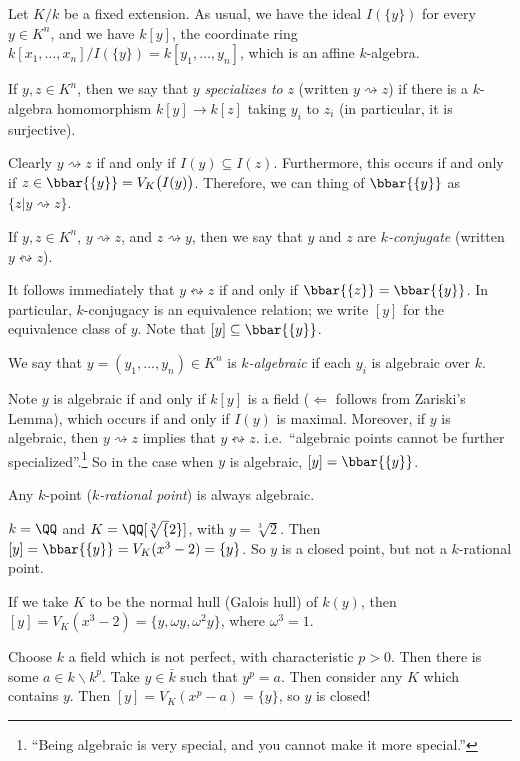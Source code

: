  Let $K/k$ be a fixed extension. As usual, we have the ideal $I(\{y\})$ for every $y\in
 K^n$, and we have $k[y]$, the coordinate ring $k[x_1,\dots, x_n]/I(\{y\}) = k[y_1,\dots,
 y_n]$, which is an affine $k$-algebra.
 \begin{definition}
   If $y,z\in K^n$, then we say that $y$ \emph{specializes to} $z$ (written
   $y\rightsquigarrow z$) if there is a $k$-algebra homomorphism $k[y]\to k[z]$ taking
   $y_i$ to $z_i$ (in particular, it is surjective).
 \end{definition}
 Clearly $y\rightsquigarrow z$ if and only if $I(y)\subseteq I(z)$. Furthermore, this
 occurs if and only if $z\in \bbar {\{y\}}=V_K\bigl(I(y)\bigr)$. Therefore, we can thing
 of $\bbar {\{y\}}$ as $\{z|y\rightsquigarrow z\}$.
 \begin{definition}
   If $y,z\in K^n$, $y\rightsquigarrow z$, and $z\rightsquigarrow y$, then we say that
   $y$ and $z$ are \emph{$k$-conjugate} (written $ y\leftrightsquigarrow z$).
 \end{definition}
 It follows immediately that $y\leftrightsquigarrow z$ if and only if $\bbar {\{z\}} =
 \bbar {\{y\}}$. In particular, $k$-conjugacy is an equivalence relation; we write $[y]$
 for the equivalence class of $y$. Note that $[y]\subseteq \bbar {\{y\}}$.
 \begin{definition}
   We say that $y=(y_1,\dots, y_n)\in K^n$ is \emph{$k$-algebraic} if each $y_i$ is
   algebraic over $k$.
 \end{definition}
 Note $y$ is algebraic if and only if $k[y]$ is a field ($\Leftarrow$ follows from
 Zariski's Lemma), which occurs if and only if $I(y)$ is maximal. Moreover, if $y$ is
 algebraic, then $y \rightsquigarrow z$ implies that $y\leftrightsquigarrow z$. i.e.\
 ``algebraic points cannot be further specialized''.\footnote{``Being algebraic is very
 special, and you cannot make it more special.''} So in the case when $y$ is algebraic,
 $[y]=\bbar {\{y\}}$.
 \begin{remark}
   Any $k$-point (\emph{$k$-rational point}) is always algebraic.
 \end{remark}
 \begin{example}
   $k=\QQ$ and $K=\QQ[\sqrt[3]{2}]$, with $y=\sqrt[3]{2}$. Then $[y]=\bbar
   {\{y\}}=V_K(x^3-2)=\{y\}$. So $y$ is a closed point, but not a $k$-rational point.

   If we take $K$ to be the normal hull (Galois hull) of $k(y)$, then $[y]=V_K(x^3-2) =
   \{y,\omega y,\omega^2 y\}$, where $\omega^3=1$.
 \end{example}
 \begin{example}
   Choose $k$ a field which is not perfect, with characteristic $p>0$. Then there is some
   $a\in k\smallsetminus k^p$. Take $y\in \bar k$ such that $y^p=a$. Then consider any
   $K$ which contains $y$. Then $[y]=V_K(x^p-a)=\{y\}$, so $y$ is closed!
 \end{example}

